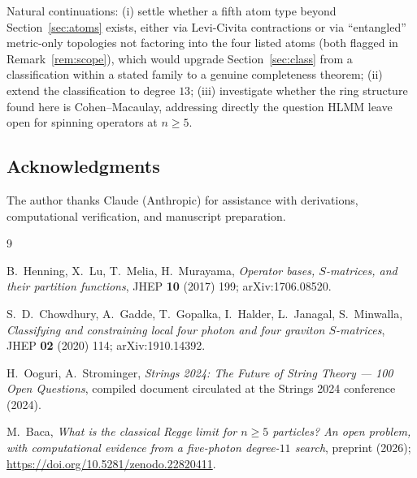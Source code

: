 \documentclass[reqno]{amsart}
\begin{document}
Natural continuations: (i) settle whether a fifth atom type beyond Section~\ref{sec:atoms} exists,
either via Levi-Civita contractions or via ``entangled'' metric-only topologies not factoring into
the four listed atoms (both flagged in Remark~\ref{rem:scope}), which would upgrade
Section~\ref{sec:class} from a classification within a stated family to a genuine completeness
theorem; (ii) extend the classification to degree $13$; (iii) investigate whether the ring
structure found here is Cohen--Macaulay, addressing directly the question HLMM leave open for
spinning operators at $n\geq5$.

\subsection*{Acknowledgments}
The author thanks Claude (Anthropic) for assistance with derivations, computational verification,
and manuscript preparation.

\begin{thebibliography}{9}

B.~Henning, X.~Lu, T.~Melia, H.~Murayama, \emph{Operator bases, $S$-matrices, and their
partition functions}, JHEP \textbf{10} (2017) 199; arXiv:1706.08520.

S.~D.~Chowdhury, A.~Gadde, T.~Gopalka, I.~Halder, L.~Janagal, S.~Minwalla, \emph{Classifying and
constraining local four photon and four graviton $S$-matrices}, JHEP \textbf{02} (2020) 114;
arXiv:1910.14392.

H.~Ooguri, A.~Strominger, \emph{Strings 2024: The Future of String Theory --- 100 Open
Questions}, compiled document circulated at the Strings 2024 conference (2024).

M.~Baca, \emph{What is the classical Regge limit for $n\geq5$ particles? An open problem, with
computational evidence from a five-photon degree-$11$ search}, preprint (2026);
\url{https://doi.org/10.5281/zenodo.22820411}.

\end{thebibliography}
\end{document}
